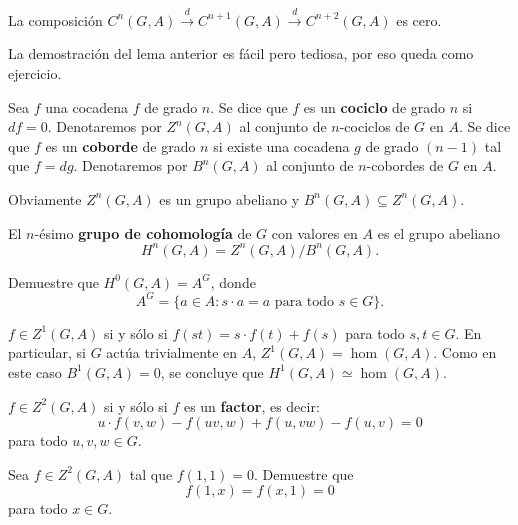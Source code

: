 \begin{lemma}
	\label{lemma:dd=0}
	La composición $C^n(G,A)\xrightarrow{d} C^{n+1}(G,A)\xrightarrow{d}
	C^{n+2}(G,A)$ es cero.
\end{lemma}

La demostración del lema anterior es fácil pero tediosa, por eso queda como ejercicio. 

\begin{definition}
	Sea $f$ una cocadena $f$ de grado $n$. Se dice que $f$ es un
	\textbf{cociclo} de grado $n$ si $df=0$. Denotaremos por $Z^n(G,A)$ al
	conjunto de $n$-cociclos de $G$ en $A$. Se dice que $f$ es un
	\textbf{coborde} de grado $n$ si existe una cocadena $g$ de grado $(n-1)$
	tal que $f=dg$. Denotaremos por $B^n(G,A)$ al conjunto de $n$-cobordes de
	$G$ en $A$.
\end{definition}

Obviamente $Z^n(G,A)$ es un grupo abeliano y $B^n(G,A)\subseteq Z^n(G,A)$.

\begin{definition}
	El $n$-ésimo \textbf{grupo de cohomología} de $G$ con valores en $A$
	es el grupo abeliano
	\[
	H^n(G,A)=Z^n(G,A)/B^n(G,A).
	\]
\end{definition}

\begin{exercise}
\label{xca:H0}
	Demuestre que $H^0(G,A)=A^G$, donde 
	\[
	A^G=\{a\in A:s\cdot a=a\text{ para todo $s\in G$}\}. 
	\]
\end{exercise}

\begin{example}
	$f\in Z^1(G,A)$ si y sólo si $f(st)=s\cdot f(t)+f(s)$ para todo $s,t\in G$.
	En particular, si $G$ actúa trivialmente en $A$, $Z^1(G,A)=\hom(G,A)$. Como
	en este caso $B^1(G,A)=0$, se concluye que $H^1(G,A)\simeq\hom(G,A)$. 
\end{example}

\begin{example}
	$f\in Z^2(G,A)$ si y sólo si $f$ es un \textbf{factor}, es decir:
	\begin{equation}
		\label{eq:2cociclo}
		u\cdot f(v,w)-f(uv,w)+f(u,vw)-f(u,v)=0
	\end{equation}
	para todo $u,v,w\in G$.
\end{example}

\begin{exercise}
	Sea $f\in Z^2(G,A)$ tal que $f(1,1)=0$. Demuestre que 
	\[
	f(1,x)=f(x,1)=0
	\]
	para todo $x\in G$.
\end{exercise}

